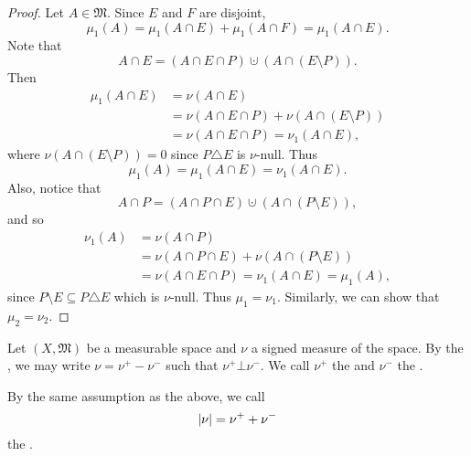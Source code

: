 \documentclass[notoc,notitlepage]{tufte-book}
\begin{document}
\begin{proof}
  Let $A \in \mathfrak{M}$. Since $E$ and $F$ are disjoint,
  \begin{equation*}
    \mu_1(A) = \mu_1(A \cap E) + \mu_1(A \cap F) = \mu_1(A \cap E).
  \end{equation*}
  Note that
  \begin{equation*}
    A \cap E = (A \cap E \cap P) \cupdot (A \cap (E \setminus P)).
  \end{equation*}
  Then
  \begin{align*}
    \mu_1(A \cap E) &= \nu(A \cap E) \\
                    &= \nu(A \cap E \cap P) + \nu(A \cap (E \setminus P)) \\
                    &= \nu(A \cap E \cap P) = \nu_1(A \cap E),
  \end{align*}
  where $\nu(A \cap (E \setminus P)) = 0$ since $P \triangle E$ is $\nu$-null.
  Thus
  \begin{equation*}
    \mu_1(A) = \mu_1(A \cap E) = \nu_1(A \cap E).
  \end{equation*}
  Also, notice that
  \begin{equation*}
    A \cap P = (A \cap P \cap E) \cupdot (A \cap (P \setminus E)),
  \end{equation*}
  and so
  \begin{align*}
    \nu_1(A) &= \nu(A \cap P) \\
             &= \nu(A \cap P \cap E) + \nu(A \cap (P \setminus E)) \\
             &= \nu(A \cap E \cap P) = \nu_1(A \cap E) = \mu_1(A),
  \end{align*}
  since $P \setminus E \subseteq P \triangle E$ which is $\nu$-null.
  Thus $\mu_1 = \nu_1$.
  Similarly, we can show that $\mu_2 = \nu_2$.
\end{proof}

\begin{defn}\label{defn:positive_and_negative_variation_of_a_signed_measure}
  Let $(X, \mathfrak{M})$ be a measurable space and $\nu$ a signed measure
  of the space. By the ,
  we may write $\nu = \nu^+ - \nu^-$ such that $\nu^+ \bot \nu^-$.
  We call $\nu^+$ the 
  and $\nu^-$ the .
\end{defn}

\begin{defn}\label{defn:total_variation_of_a_signed_measure}
  By the same assumption as the above, we call
  \begin{equation*}
    \left|\nu\right| = \nu^+ + \nu^-
  \end{equation*}
  the .
\end{defn}
\end{document}
